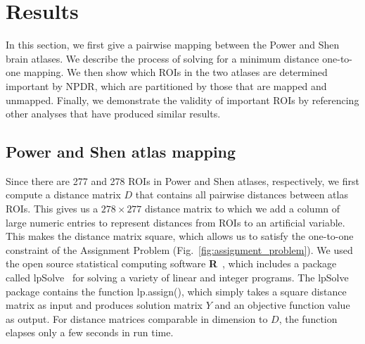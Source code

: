 \documentclass[10pt,letterpaper]{article}\usepackage[]{graphicx}\usepackage[]{color}
\begin{document}
\section{Results}
In this section, we first give a pairwise mapping between the Power and Shen brain atlases. We describe the process of solving for a minimum distance one-to-one mapping. We then show which ROIs in the two atlases are determined important by NPDR, which are partitioned by those that are mapped and unmapped. Finally, we demonstrate the validity of important ROIs by referencing other analyses that have produced similar results.

\subsection{Power and Shen atlas mapping}
Since there are 277 and 278 ROIs in Power and Shen atlases, respectively, we first compute a distance matrix $D$ that contains all pairwise distances between atlas ROIs. This gives us a $278 \times 277$ distance matrix to which we add a column of large numeric entries to represent distances from ROIs to an artificial variable. This makes the distance matrix square, which allows us to satisfy the one-to-one constraint of the Assignment Problem (Fig.~\ref{fig:assignment_problem}). We used the open source statistical computing software \textbf{\textsf{R}}~\cite{R}, which includes a package called \textsf{lpSolve}~\cite{lpsolve} for solving a variety of linear and integer programs. The \textsf{lpSolve} package contains the function \textsf{lp.assign()}, which simply takes a square distance matrix as input and produces solution matrix $Y$ and an objective function value as output. For distance matrices comparable in dimension to $D$, the function elapses only a few seconds in run time.
\end{document}
